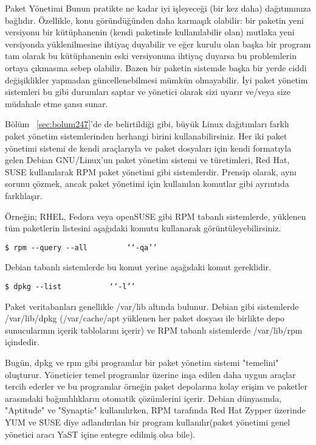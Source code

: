 \begin{section}{Paket Yönetimi}
Bunun pratikte ne kadar iyi işleyeceği (bir kez daha) dağıtımınıza bağlıdır. Özellikle, konu göründüğünden daha karmaşık olabilir: bir paketin yeni versiyonu bir kütüphanenin (kendi paketinde kullanılabilir olan) mutlaka yeni versiyonda yüklenilmesine ihtiyaç duyabilir ve eğer kurulu olan başka bir program tam olarak bu kütüphanenin eski versiyonuna ihtiyaç duyarsa bu problemlerin ortaya çıkmasına sebep olabilir. Bazen bir paketin sistemde başka bir yerde ciddi değişiklikler yapmadan güncellenebilmesi mümkün olmayabilir. İyi paket yönetim sistemleri bu gibi durumları saptar ve yönetici olarak sizi uyarır ve/veya size 	müdahale etme şansı sunar.

Bölüm ~\ref{sec:bolum247}'de de belirtildiği gibi, büyük Linux dağıtımları farklı paket yönetim sistemlerinden herhangi birini kullanabilirsiniz. Her iki paket yönetimi sistemi de kendi araçlarıyla ve paket dosyaları için kendi formatıyla gelen Debian GNU/Linux'un paket yönetim sistemi ve türetimleri, Red Hat, SUSE kullanılarak RPM paket yönetimi gibi sistemlerdir. Prensip olarak, aynı sorunu çözmek, ancak paket yönetimi için kullanılan komutlar gibi ayrıntıda farklılaşır.

Örneğin; RHEL, Fedora veya openSUSE gibi RPM tabanlı sistemlerde, yüklenen tüm paketlerin listesini aşağıdaki komutu kullanarak görüntüleyebilirsiniz.
\begin{verbatim}
$ rpm --query --all 		‘‘-qa’’
\end{verbatim}

Debian tabanlı sistemlerde bu komut yerine aşağıdaki komut gereklidir.
\begin{verbatim}
$ dpkg --list 			‘‘-l’’
\end{verbatim}

Paket veritabanları genellikle /var/lib altında bulunur. Debian gibi sistemlerde /var/lib/dpkg (/var/cache/apt yüklenen her paket dosyası ile birlikte depo sunucularının içerik tablolarını içerir) ve RPM tabanlı sistemlerde /var/lib/rpm içindedir.
  
Bugün, dpkg ve rpm gibi programlar bir paket yönetim sistemi "temelini" oluşturur. Yöneticier temel programlar üzerine inşa edilen daha uygun araçlar tercih ederler ve bu programlar örneğin paket depolarına kolay erişim ve paketler arasındaki bağımlılıkların otomatik çözümlerini içerir. Debian dünyasında, "Aptitude" ve "Synaptic" kullanılırken, RPM tarafında Red Hat Zypper üzerinde YUM ve SUSE diye adlandırılan bir program kullanılır(paket yönetimi  genel yönetici aracı YaST içine entegre edilmiş olsa bile).


\end{section}
